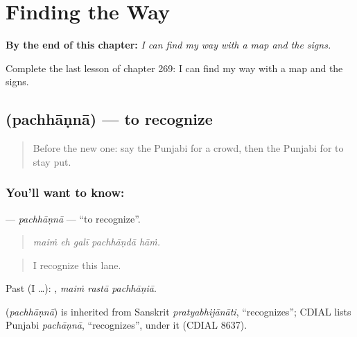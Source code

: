 
\chapter{Finding the Way}
\label{ch:pa-a2-finding-the-way}

\begin{chapteropening}
\textbf{By the end of this chapter:} \emph{I can find my way with a map and the signs.}

Complete the last lesson of chapter 269: I can find my way with a map and the signs.
\end{chapteropening}

\section[\texorpdfstring{\pa{ਪਛਾਣਨਾ} (pachhāṇnā)}{ਪਛਾਣਨਾ (pachhāṇnā)}]{ (pachhāṇnā) — to recognize}

\label{lesson:PA-C269-pachhanna}



\begin{quote}
Before the new one: say the Punjabi for a crowd, then the Punjabi for to stay put.
\end{quote}

\subsection*{You'll want to know: }
\textbf{} — \emph{pachhāṇnā} — \textquotedblleft{}to recognize\textquotedblright{}.

\begin{quote}
    
\end{quote}

\begin{quote}
\emph{maiṁ eh galī pachhāṇdā hāṁ.}
\end{quote}

\begin{quote}
I recognize this lane.
\end{quote}

Past (I …):   , \emph{maiṁ rastā pachhāṇiā}.

\begin{cousinweb}
\textbf{} (\emph{pachhāṇnā}) is inherited from Sanskrit \emph{pratyabhijānāti}, \textquotedblleft{}recognizes\textquotedblright{}; CDIAL lists Punjabi \emph{pachāṇnā}, \textquotedblleft{}recognizes\textquotedblright{}, under it (CDIAL 8637).
\end{cousinweb}

